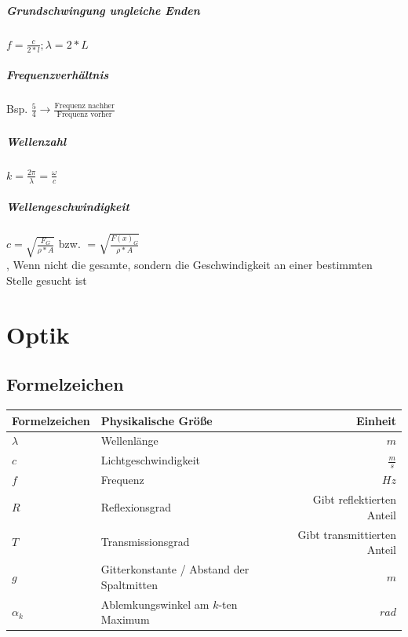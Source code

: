 \documentclass[12pt, a4paper]{scrreprt}
\begin{document}
\paragraph{Grundschwingung ungleiche Enden} \dotfill \(f = \frac{c}{2*l} ; \lambda = 2 * L\)
\paragraph{Frequenzverhältnis} \dotfill Bsp. \(\frac{5}{4} \rightarrow \frac{\text{Frequenz nachher}}{\text{Frequenz vorher}}\)
\paragraph{Wellenzahl} \dotfill \(k = \frac{2\pi}{\lambda} = \frac{\omega}{c}\)
\paragraph{Wellengeschwindigkeit} \dotfill \(c = \sqrt{\frac{F_G}{\rho * A}}\) bzw. \(= \sqrt{\frac{F(x)_G}{\rho * A}}\)\\ , Wenn nicht die gesamte, sondern die Geschwindigkeit an einer bestimmten Stelle gesucht ist



\chapter{Optik}

\section{Formelzeichen}

\begin{center}
  \makegapedcells
  \begin{tabular}{l | l | r}
    Formelzeichen & Physikalische Größe & Einheit\\
    \hline \hline
    \(\lambda\) & Wellenlänge & \(m\)\\ \hline
    \(c\) & Lichtgeschwindigkeit & \(\frac{m}{s}\)\\ \hline
    \(f\) & Frequenz & \(Hz\)\\ \hline
    \(R\) & Reflexionsgrad & Gibt reflektierten Anteil\\ \hline
    \(T\) & Transmissionsgrad & Gibt transmittierten Anteil\\ \hline
    \(g\) & Gitterkonstante / Abstand der Spaltmitten & \(m\)\\ \hline
    \(\alpha_k\) & Ablemkungswinkel am \(k\)-ten Maximum & \(rad\)\\ \hline
  \end{tabular}
\end{center}
\end{document}
